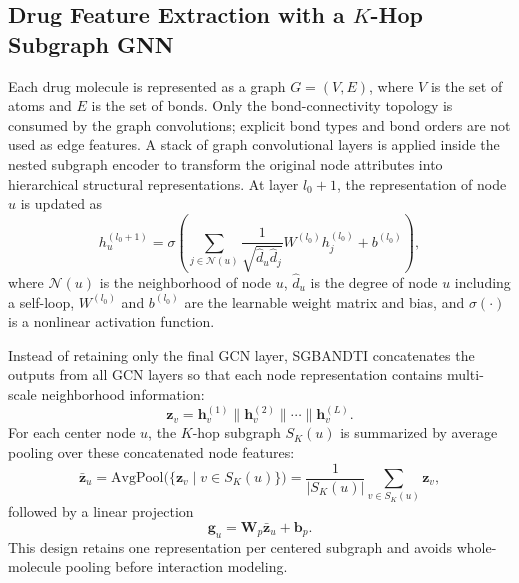 \documentclass[computers,article,submit,moreauthors]{Definitions/mdpi}
\begin{document}
\subsection{Drug Feature Extraction with a \texorpdfstring{$K$}{K}-Hop Subgraph GNN}
Each drug molecule is represented as a graph $G = (V, E)$, where $V$ is the set of atoms and $E$ is the set of bonds. Only the bond-connectivity topology is consumed by the graph convolutions; explicit bond types and bond orders are not used as edge features. A stack of graph convolutional layers is applied inside the nested subgraph encoder to transform the original node attributes into hierarchical structural representations. At layer $l_0 + 1$, the representation of node $u$ is updated as
\begin{equation}
h_u^{(l_0+1)} = \sigma \left( \sum_{j \in \mathcal{N}(u)} \frac{1}{\sqrt{\hat{d}_u \hat{d}_j}} W^{(l_0)} h_j^{(l_0)} + b^{(l_0)} \right),
\end{equation}
where $\mathcal{N}(u)$ is the neighborhood of node $u$, $\hat{d}_u$ is the degree of node $u$ including a self-loop, $W^{(l_0)}$ and $b^{(l_0)}$ are the learnable weight matrix and bias, and $\sigma(\cdot)$ is a nonlinear activation function.

Instead of retaining only the final GCN layer, SGBANDTI concatenates the outputs from all GCN layers so that each node representation contains multi-scale neighborhood information:
\begin{equation}
\mathbf{z}_v = \mathbf{h}_v^{(1)} \mathbin{\|} \mathbf{h}_v^{(2)} \mathbin{\|} \cdots \mathbin{\|} \mathbf{h}_v^{(L)}.
\end{equation}
For each center node $u$, the $K$-hop subgraph $S_K(u)$ is summarized by average pooling over these concatenated node features:
\begin{equation}
\bar{\mathbf{z}}_u = \mathrm{AvgPool}\big(\{\mathbf{z}_v \mid v \in S_K(u)\}\big) = \frac{1}{|S_K(u)|}\sum_{v \in S_K(u)} \mathbf{z}_v,
\end{equation}
followed by a linear projection
\begin{equation}
\mathbf{g}_u = \mathbf{W}_p \bar{\mathbf{z}}_u + \mathbf{b}_p.
\end{equation}
This design retains one representation per centered subgraph and avoids whole-molecule pooling before interaction modeling.
\end{document}
